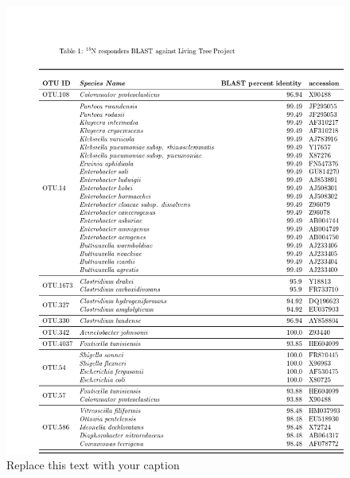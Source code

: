 \begin{figure}[h!]
  \centering
    \includegraphics[width=1.0\textwidth]{figures/LTP_blast_table/LTP_blast_table.png}
  \caption{Replace this text with your caption}
  \label{tab:LTP_blast}
\end{figure}

